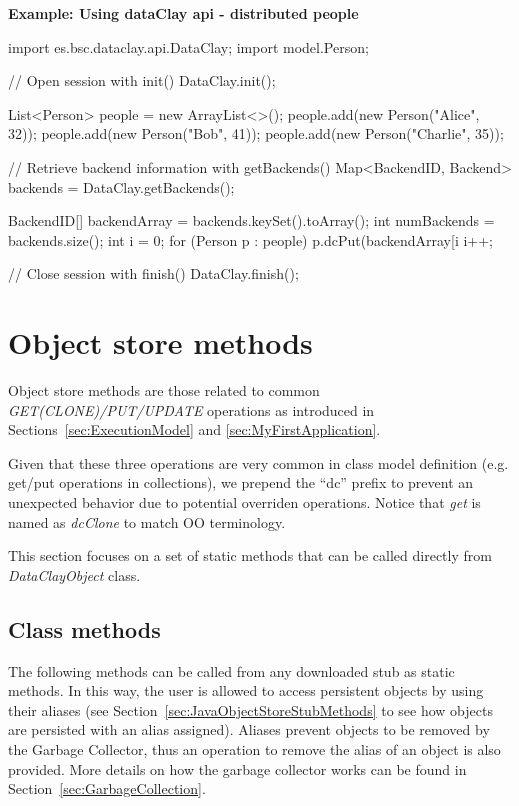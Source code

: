 \begin{tBox}
\textcolor{basecolor} {\bf Example: Using dataClay api - distributed people}
\begin{java}
import es.bsc.dataclay.api.DataClay;
import model.Person;

// Open session with init()
DataClay.init();

List<Person> people = new ArrayList<>();
people.add(new Person("Alice", 32));
people.add(new Person("Bob", 41));
people.add(new Person("Charlie", 35));

// Retrieve backend information with getBackends()
Map<BackendID, Backend> backends = DataClay.getBackends();

BackendID[] backendArray = backends.keySet().toArray();
int numBackends = backends.size();
int i = 0;
for (Person p : people) {
  p.dcPut(backendArray[i %
  i++;
}

// Close session with finish()
DataClay.finish();
\end{java}
\end{tBox}


\section{Object store methods}
\label{sec:JavaObjectStore}

Object store methods are those related to common \textit{GET(CLONE)/PUT/UPDATE} operations as introduced in Sections~\ref{sec:ExecutionModel} and \ref{sec:MyFirstApplication}.

Given that these three operations are very common in class model definition (e.g. get/put operations in collections), we prepend the ``dc'' prefix to prevent an unexpected behavior due to potential overriden operations. Notice that \textit{get} is named as \textit{dcClone} to match OO terminology.

This section focuses on a set of static methods that can be called directly from \textit{DataClayObject} class.



\subsection{Class methods}
\label{sec:JavaClassMethodsObjectStore}

The following methods can be called from any downloaded stub as static methods. In this way, the user is allowed to access persistent objects by using their aliases (see Section~\ref{sec:JavaObjectStoreStubMethods} to see how objects are persisted with an alias assigned). Aliases prevent objects to be removed by the Garbage Collector, thus an operation to remove the alias of an object is also provided. More details on how the garbage collector works can be found in Section~\ref{sec:GarbageCollection}. 

